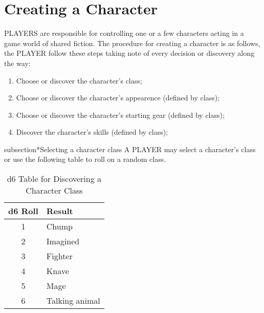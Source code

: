 \section{Creating a Character}
PLAYERS are responsible for controlling one or a few characters acting in a game world of shared fiction. The procedure for creating a character is as follows, the PLAYER follow these steps taking note of every decision or discovery along the way:
\begin{enumerate}
  \item {Choose or discover the character's class;}
  \item {Choose or discover the character's appearence (defined by class);}
  \item {Choose or discover the character's starting gear (defined by class);}
  \item {Discover the character's skills (defined by class);}
\end{enumerate}

subsection*{Selecting a character class}
A PLAYER may select a character's class or use the following table to roll on a random class.
\begin{table}[h!]
\centering
\begin{tabular}{|c|l|}
\hline
\textbf{d6 Roll} & \textbf{Result} \\
\hline
1 & Chump \\
2 & Imagined \\
3 & Fighter \\
4 & Knave \\
5 & Mage \\
6 & Talking animal \\
\hline
\end{tabular}
\caption{d6 Table for Discovering a Character Class}
\label{tab:d6_character_table}
\end{table}
